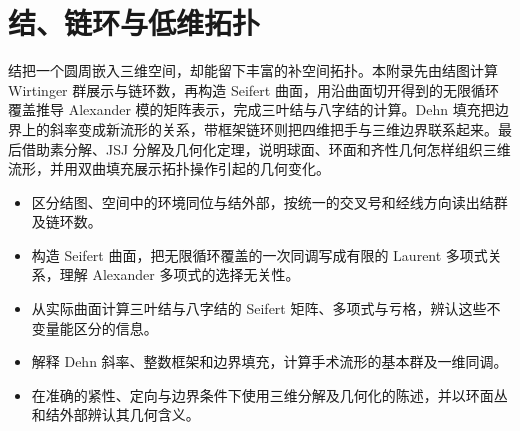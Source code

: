 
% 
% 
% 
% 
% 
% 
% 
% 
% 

\chapter{结、链环与低维拓扑}
\label{g2:app:A}

\begin{chapterabstract}
	结把一个圆周嵌入三维空间，却能留下丰富的补空间拓扑。本附录先由结图计算 Wirtinger 群展示与链环数，再构造 Seifert 曲面，用沿曲面切开得到的无限循环覆盖推导 Alexander 模的矩阵表示，完成三叶结与八字结的计算。Dehn 填充把边界上的斜率变成新流形的关系，带框架链环则把四维把手与三维边界联系起来。最后借助素分解、JSJ 分解及几何化定理，说明球面、环面和齐性几何怎样组织三维流形，并用双曲填充展示拓扑操作引起的几何变化。
\end{chapterabstract}

\begin{learninggoals}
	\begin{itemize}
		\item 区分结图、空间中的环境同位与结外部，按统一的交叉号和经线方向读出结群及链环数。
		\item 构造 Seifert 曲面，把无限循环覆盖的一次同调写成有限的 Laurent 多项式关系，理解 Alexander 多项式的选择无关性。
		\item 从实际曲面计算三叶结与八字结的 Seifert 矩阵、多项式与亏格，辨认这些不变量能区分的信息。
		\item 解释 Dehn 斜率、整数框架和边界填充，计算手术流形的基本群及一维同调。
		\item 在准确的紧性、定向与边界条件下使用三维分解及几何化的陈述，并以环面丛和结外部辨认其几何含义。
	\end{itemize}
\end{learninggoals}

